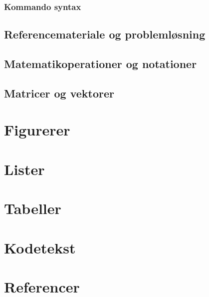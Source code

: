 \documentclass{article}
\begin{document}
\subsubsection{Kommando syntax}

\subsection{Referencemateriale og problemløsning}




\subsection{Matematikoperationer og notationer}

\subsection{Matricer og vektorer}

\section{Figurerer}

\section{Lister}

\section{Tabeller}


\section{Kodetekst}

\section{Referencer}
\end{document}
